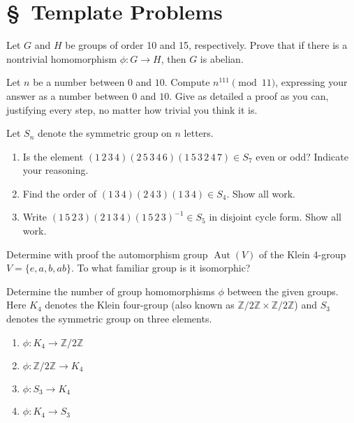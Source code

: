 \documentclass[11pt,twoside,openany]{memoir}
\begin{document}
\section*{\S\ Template Problems}

        \begin{exercise}
            Let $G$ and $H$ be groups of order 10 and 15, respectively. Prove that if there is a nontrivial homomorphism $\phi:G\to H$, then $G$ is abelian.
            \end{exercise}
            
            \begin{exercise}
            Let $n$ be a number between $0$ and $10$. Compute $n^{111}\pmod{11}$, expressing your answer as a number between $0$ and $10$. Give as detailed a proof as you can, justifying every step, no matter how trivial you think it is.
            \end{exercise}
            
            \begin{exercise}
            Let $S_n$ denote the symmetric group on $n$ letters.
            \begin{enumerate}[label=(\alph*)]
                \item Is the element $(1\,2\,3\,4)(2\,5\,3\,4\,6)(1\,5\,3\,2\,4\,7)\in S_7$ even or odd? Indicate your reasoning.
                \item Find the order of $(1\,3\,4)(2\,4\,3)(1\,3\,4)\in S_4$. Show all work.
                \item Write $(1\,5\,2\,3)(2\,1\,3\,4)(1\,5\,2\,3)^{-1}\in S_5$ in disjoint cycle form. Show all work.
            \end{enumerate}
            \end{exercise}
            
            \begin{exercise}
            Determine with proof the automorphism group $\operatorname{Aut}(V)$ of the Klein 4-group $V=\{e,a,b,ab\}$. To what familiar group is it isomorphic?
            \end{exercise}
            
            \begin{exercise}
            Determine the number of group homomorphisms $\phi$ between the given groups. Here $K_4$ denotes the Klein four-group (also known as $\mathbb{Z}/2\mathbb{Z}\times \mathbb{Z}/2\mathbb{Z}$) and $S_3$ denotes the symmetric group on three elements.
            \medskip
            \begin{enumerate}[label=(\alph*)]
                \item $\phi:K_4\to \mathbb{Z}/2\mathbb{Z}$
                \item $\phi:\mathbb{Z}/2\mathbb{Z}\to K_4$
                \item $\phi:S_3\to K_4$
                \item $\phi:K_4\to S_3$
            \end{enumerate}
            \end{exercise}
            
\end{document}
